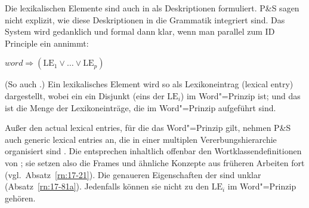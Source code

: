 \documentclass[output=paper]{LSP/langsci}
\begin{document}
\randnum\label{rn:17-12}Die lexikalischen Elemente sind auch in \citet{PollardSag1994} als Deskriptionen
formuliert. P\&S sagen nicht explizit, wie diese Deskriptionen in die
Grammatik integriert sind. Das System wird gedanklich und formal dann
klar, wenn man parallel zum ID Principle ein  annimmt:

\begin{exe}
\label{rn:17-wp2}\label{wordp}
$\textit{word} \Rightarrow (\mathrm{LE}_1 \vee \ldots{} \vee \mathrm{LE}_p)$
\end{exe}
\randnum\label{rn:17-13}(So auch \citealt{pollard1993a}.) Ein lexikalisches Element wird so als
Lexikoneintrag (lexical entry) dargestellt, wobei ein 
ein Disjunkt (eins der $\mathrm{LE}_i$) im Word"=Prinzip ist; und das  ist
die Menge der Lexikoneinträge, die im Word"=Prinzip aufgeführt sind.

\randnum\label{rn:17-14}Außer den {\glqq}actual lexical entries{\grqq}, für die das Word"=Prinzip gilt,
nehmen P\&S auch {\glqq}generic lexical entries{\grqq} an, die in einer multiplen
Vererbungshierarchie organisiert sind \citep[36f.]{PollardSag1994}. Die entsprechen
inhaltlich offenbar den Wortklassendefinitionen von \citet[299ff.]{FlickingerNerbonne1992}; sie setzen also die Frames und ähnliche Konzepte
aus früheren Arbeiten fort (vgl.\ Absatz~\ref{rn:17-21}). Die genaueren Eigenschaften
der  sind unklar (Absatz~\ref{rn:17-81a}). Jedenfalls
können sie nicht zu den $\mathrm{LE}_i$ im Word"=Prinzip gehören.
\end{document}
